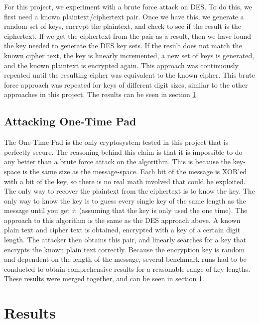 \documentclass[12pt]{report}
\begin{document}
For this project, we experiment with a brute force attack on DES. To do this, we first need a known plaintext/ciphertext pair. Once we have this, we
generate a random set of keys, encrypt the plaintext, and check to see if the result is the ciphertext. If we get the ciphertext from the pair as a result, then we
have found the key needed to generate the DES key sets. If the result does not match the known cipher text, the key is linearly incremented, a new set of keys is
generated, and the known plaintext is encrypted again. This approach was continuously repeated until the resulting cipher was equivalent to the known cipher. This
brute force approach was repeated for keys of different digit sizes, similar to the other approaches in this project. The results can be seen in section \ref{results}.

\subsection{Attacking One-Time Pad}
The One-Time Pad is the only cryptosystem tested in this project that is perfectly secure. The reasoning behind this claim is that it is impossible to do any better
than a brute force attack on the algorithm. This is because the key-space is the same size as the message-space. Each bit of the message is XOR'ed with a bit of the
key, so there is no real math involved that could be exploited. The only way to recover the plaintext from the ciphertext is to know the key. The only way to know
the key is to guess every single key of the same length as the message until you get it (assuming that the key is only used the one time). The approach to this
algorithm is the same as the DES approach above. A known plain text and cipher text is obtained, encrypted with a key of a certain digit length. The attacker then
obtains this pair, and linearly searches for a key that encrypts the known plain text correctly. Because the encryption key is random and dependent on the length of
the message, several benchmark runs had to be conducted to obtain comprehensive results for a reasonable range of key lengths. These results were merged together, and
can be seen in section \ref{results}.

\section{Results}
\label{results}
\end{document}
